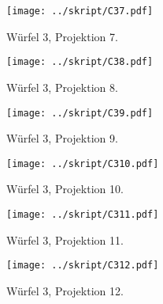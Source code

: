 \begin{figure}[htbp]
	\begin{minipage}{0.5\textwidth}
	\texttt{[image: ../skript/C37.pdf]}
	\caption{Würfel 3, Projektion 7.}
	\end{minipage}
	\hfill
	\begin{minipage}{0.5\textwidth}
	\texttt{[image: ../skript/C38.pdf]}
	\caption{Würfel 3, Projektion 8.}
	\end{minipage}
\end{figure}

\begin{figure}[htbp]
	\begin{minipage}{0.5\textwidth}
	\texttt{[image: ../skript/C39.pdf]}
	\caption{Würfel 3, Projektion 9.}
	\end{minipage}
	\hfill
	\begin{minipage}{0.5\textwidth}
	\texttt{[image: ../skript/C310.pdf]}
	\caption{Würfel 3, Projektion 10.}
	\end{minipage}
\end{figure}

\begin{figure}[htbp]
	\begin{minipage}{0.5\textwidth}
	\texttt{[image: ../skript/C311.pdf]}
	\caption{Würfel 3, Projektion 11.}
	\end{minipage}
	\hfill
	\begin{minipage}{0.5\textwidth}
	\texttt{[image: ../skript/C312.pdf]}
	\caption{Würfel 3, Projektion 12.}
	\end{minipage}
\end{figure}
